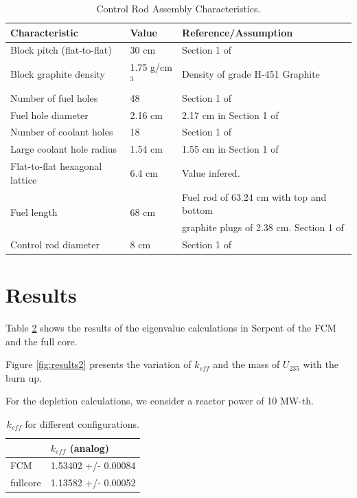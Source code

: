 \documentclass[11pt,letterpaper]{article}
\begin{document}
	\begin{table}[htbp!]
		\centering
	    \caption{Control Rod Assembly Characteristics.}
	    \label{tab:control}
		\begin{tabular}{l|l|l}
		\hline
		Characteristic                   & Value         & Reference/Assumption \\ \hline
		Block pitch (flat-to-flat)       & 30 cm         & Section 1 of \cite{hawari_development_2018} \\
		Block graphite density           & 1.75 g/cm$^3$ & Density of grade H-451 Graphite \cite{gougar_prismatic_2010} \\
		Number of fuel holes             & 48            & Section 1 of \cite{hawari_development_2018} \\
		Fuel hole diameter               & 2.16 cm       & 2.17 cm in Section 1 of \cite{hawari_development_2018} \\
		Number of coolant holes          & 18            & Section 1 of \cite{hawari_development_2018} \\
		Large coolant hole radius        & 1.54 cm       & 1.55 cm in Section 1 of \cite{hawari_development_2018} \\
		Flat-to-flat hexagonal lattice   & 6.4 cm        & Value infered. \\
		\multirow{ 2}{*}{Fuel length}    & \multirow{ 2}{*}{68 cm} & Fuel rod of 63.24 cm with top and bottom \\
                                         &               & graphite plugs of 2.38 cm. Section 1 of \cite{hawari_development_2018} \\ 
		Control rod diameter             & 8 cm          & Section 1 of \cite{hawari_development_2018} \\ \hline
		\end{tabular}
	\end{table}

\section{Results}

Table \ref{tab:results1} shows the results of the eigenvalue calculations in Serpent of the FCM and the full core.

Figure \ref{fig:results2} presents the variation of $k_{eff}$ and the mass of $U_{235}$ with the burn up.

For the depletion calculations, we consider a reactor power of 10 MW-th.

	\begin{table}[htbp!]
		\centering
	    \caption{$k_{eff}$ for different configurations.}
	    \label{tab:results1}
		\begin{tabular}{l|l}
		\hline
		             & $k_{eff}$ (analog)  \\ \hline
		FCM          & 1.53402 +/- 0.00084 \\ 
		fullcore     & 1.13582 +/- 0.00052 \\ \hline

		\end{tabular}
	\end{table}
\end{document}
